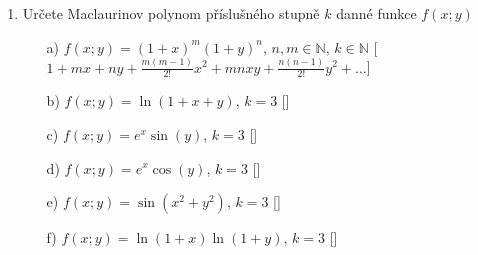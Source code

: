 \begin{enumerate}
                     
\item Určete Maclaurinov polynom příslušného stupně $k$ danné funkce $f(x;y)$
\begin{enumerate}
\item[a)]{$f(x;y)=(1+x)^m(1+y)^n$}, $n,m \in \mathbb{N}$, $k \in \mathbb{N}$
\hspace{\fill}[$1+mx+ny+\frac{m(m-1)}{2!}x^2+mnxy+\frac{n(n-1)}{2!}y^2+...$]
\item[b)]{$f(x;y)=\ln(1+x+y)$}, $k=3$
\hspace{\fill}[]
\item[c)]{$f(x;y)=e^x\sin(y)$}, $k=3$
\hspace{\fill}[]
\item[d)]{$f(x;y)=e^x\cos(y)$}, $k=3$
\hspace{\fill}[]
\item[e)]{$f(x;y)=\sin(x^2+y^2)$}, $k=3$
\hspace{\fill}[]
\item[f)]{$f(x;y)=\ln(1+x)\ln(1+y)$}, $k=3$
\hspace{\fill}[]
\end{enumerate}
\end{enumerate}